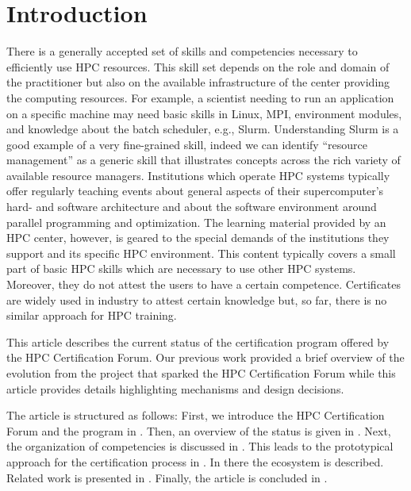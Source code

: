 \documentclass[jocse]{jocseart}
\newcommand{\kh}[1]{\todo[inline]{KH: #1}}
\begin{document}
\keywords{}

\maketitle

\section{Introduction}

There is a generally accepted set of skills and competencies necessary to efficiently use HPC resources.
This skill set depends on the role and domain of the practitioner but also on the available infrastructure of the center providing the computing resources.
For example, a scientist needing to run an application on a specific machine may need basic skills in Linux, MPI, environment modules, and knowledge about the batch scheduler, e.g., Slurm.
Understanding Slurm is a good example of a very fine-grained skill, indeed we can identify “resource management” as a generic skill that illustrates concepts across the rich variety of available resource managers.
Institutions which operate HPC systems typically offer regularly teaching events about general aspects of their supercomputer's hard- and software architecture and about the software environment around parallel programming and optimization.
The learning material provided by an HPC center, however, is geared to the special demands of the institutions they support and its specific HPC environment.
This content typically covers a small part of basic HPC skills which are necessary to use other HPC systems.
Moreover, they do not attest the users to have a certain competence.
Certificates are widely used in industry to attest certain knowledge but, so far, there is no similar approach for HPC training.

This article describes the current status of the certification program offered by the HPC Certification Forum.
Our previous work provided a brief overview of the evolution from the project that sparked  the HPC Certification Forum \cite{TAHCPKHHSS19} while this article provides details highlighting mechanisms and design decisions.

The article is structured as follows:
First, we introduce the HPC Certification Forum and the program in .
Then, an overview of the status is given in .
Next, the organization of competencies is discussed in .
This leads to the prototypical approach for the certification process in .
In  there\kh{Vorschlag: ohne there} the ecosystem is described.
Related work is presented in .
Finally, the article is concluded in .
\end{document}
